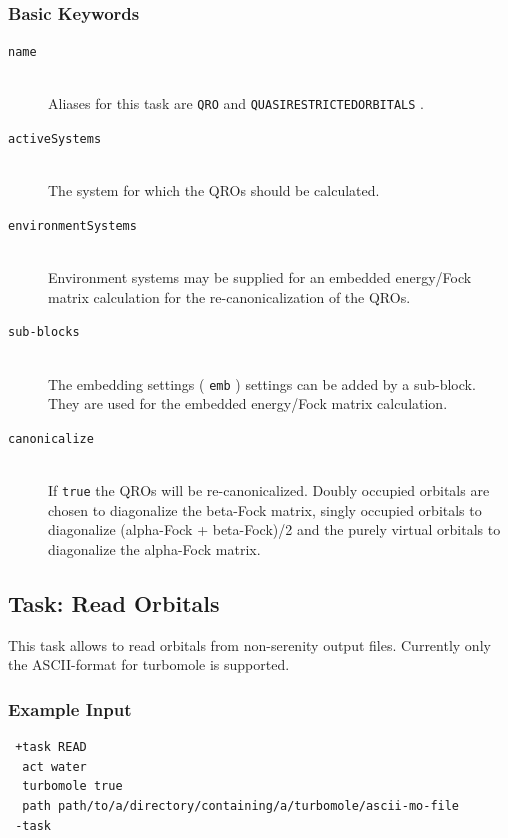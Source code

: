 \documentclass[bibliography=totocnumbered,a4paper,10pt,oneside]{scrbook}
\newcommand{\ttt}[1]{%
  \begingroup\setlength{\fboxsep}{1pt}%
  \colorbox{serenity-green!30}{\texttt{\hspace*{2pt}\vphantom{(g}#1\hspace*{2pt}}}%
  \endgroup
}
\begin{document}
\subsubsection{Basic Keywords}
\begin{description}
 \item [\texttt{name}]\hfill \\
  Aliases for this task are \ttt{QRO} and \ttt{QUASIRESTRICTEDORBITALS}.
 \item [\texttt{activeSystems}]\hfill \\
  The system for which the QROs should be calculated.
 \item [\texttt{environmentSystems}]\hfill \\
  Environment systems may be supplied for an embedded energy/Fock matrix calculation
  for the re-canonicalization of the QROs.
 \item[\texttt{sub-blocks}]\hfill \\
  The embedding settings (\ttt{emb}) settings can be added by a sub-block. They are used for the embedded energy/Fock matrix
  calculation.
 \item [\texttt{canonicalize}]\hfill \\
  If \ttt{true} the QROs will be re-canonicalized. Doubly occupied orbitals are chosen to
  diagonalize the beta-Fock matrix, singly occupied orbitals to diagonalize (alpha-Fock + beta-Fock)/2
  and the purely virtual orbitals to diagonalize the alpha-Fock matrix.
\end{description}

\subsection{Task: Read Orbitals}

This task allows to read orbitals from non-serenity output files.
Currently only the ASCII-format for turbomole is supported.
\subsubsection{Example Input}
\begin{lstlisting}
 +task READ
  act water
  turbomole true
  path path/to/a/directory/containing/a/turbomole/ascii-mo-file
 -task
\end{lstlisting}
\end{document}
